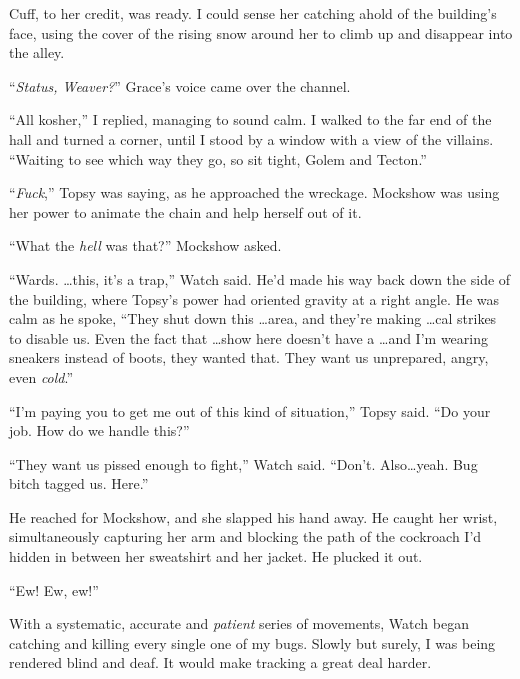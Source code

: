 Cuff, to her credit, was ready.  I could sense her catching ahold of the building's face, using the cover of the rising snow around her to climb up and disappear into the alley.



``\emph{Status, Weaver?}'' Grace's voice came over the channel.



``All kosher,'' I replied, managing to sound calm.  I walked to the far end of the hall and turned a corner, until I stood by a window with a view of the villains.  ``Waiting to see which way they go, so sit tight, Golem and Tecton.''



``\emph{Fuck},'' Topsy was saying, as he approached the wreckage.  Mockshow was using her power to animate the chain and help herself out of it.



``What the \emph{hell} was that?'' Mockshow asked.



``Wards.  \ldots this, it's a trap,'' Watch said.  He'd made his way back down the side of the building, where Topsy's power had oriented gravity at a right angle.  He was calm as he spoke, ``They shut down this \ldots area, and they're making \ldots{}cal strikes to disable us.  Even the fact that \ldots{}show here doesn't have a \ldots and I'm wearing sneakers instead of boots, they wanted that.  They want us unprepared, angry, even \emph{cold}.''



``I'm paying you to get me out of this kind of situation,'' Topsy said.  ``Do your job.  How do we handle this?''



``They want us pissed enough to fight,'' Watch said.  ``Don't.  Also\ldots yeah.  Bug bitch tagged us.  Here.''



He reached for Mockshow, and she slapped his hand away.  He caught her wrist, simultaneously capturing her arm and blocking the path of the cockroach I'd hidden in between her sweatshirt and her jacket.  He plucked it out.



``Ew!  Ew, ew!''



With a systematic, accurate and \emph{patient} series of movements, Watch began catching and killing every single one of my bugs.  Slowly but surely, I was being rendered blind and deaf.  It would make tracking a great deal harder.



